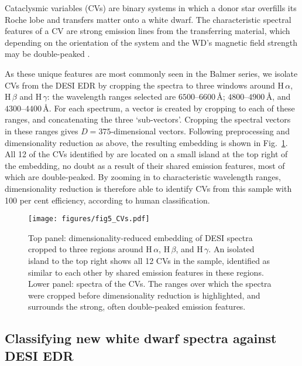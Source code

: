 \documentclass[fleqn,usenatbib]{mnras}
\begin{document}
Cataclysmic variables (CVs) are binary systems in which a donor star overfills its Roche lobe and transfers matter onto a white dwarf.
The characteristic spectral features of a CV are strong emission lines from the transferring material, which depending on the orientation of the system and the WD's magnetic field strength may be double-peaked \citep{smak69, huang72}.

As these unique features are most commonly seen in the Balmer series, we isolate CVs from the DESI EDR by cropping the spectra to three windows around H$\,\alpha$, H$\,\beta$ and H$\,\gamma$:
the wavelength ranges selected are $6500$--$6600\,\text{\AA}$; $4800$--$4900\,\text{\AA}$, and $4300$--$4400\,\text{\AA}$.
For each spectrum, a vector is created by cropping to each of these ranges, and concatenating the three `sub-vectors'.
Cropping the spectral vectors in these ranges gives $D=375$-dimensional vectors.
Following preprocessing and dimensionality reduction as above, the resulting embedding is shown in Fig.~\ref{fig:CVs}.
All 12 of the CVs identified by \citet{manser24} are located on a small island at the top right of the embedding, no doubt as a result of their shared emission features, most of which are double-peaked.
By zooming in to characteristic wavelength ranges, dimensionality reduction is therefore able to identify CVs from this sample with 100 per cent efficiency, according to human classification.

\begin{figure}
\centering
\texttt{[image: figures/fig5\_CVs.pdf]}
\caption{
    Top panel: dimensionality-reduced embedding of DESI spectra cropped to three regions around H\,$\alpha$, H\,$\beta$, and H\,$\gamma$.
    An isolated island to the top right shows all 12 CVs in the sample, identified as similar to each other by shared emission features in these regions.
    Lower panel: spectra of the CVs.
    The ranges over which the spectra were cropped before dimensionality reduction is highlighted, and surrounds the strong, often double-peaked emission features.
}
\label{fig:CVs}
\end{figure}


\subsection{Classifying new white dwarf spectra against DESI EDR}
\end{document}
